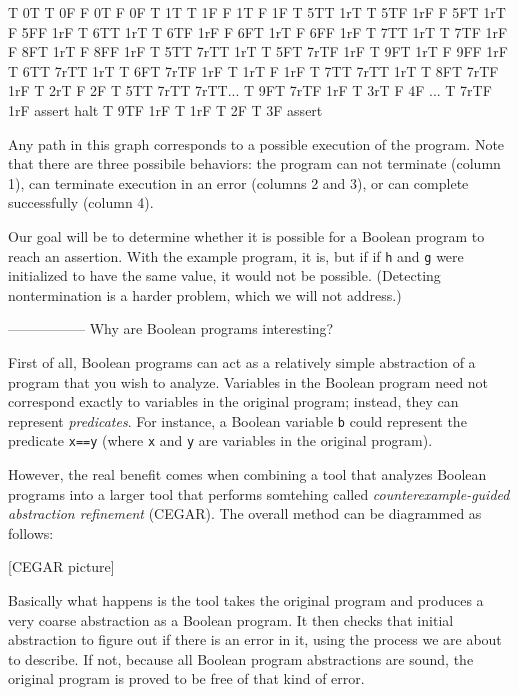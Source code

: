 \documentclass{article}
\newcommand{\code}[1]{\texttt{#1}}
\begin{document}
  T 0T               T 0F            F 0T          F 0F
  T 1T               T 1F            F 1T          F 1F
  T 5TT 1rT          T 5TF 1rF       F 5FT 1rT     F 5FF 1rF
  T 6TT 1rT          T 6TF 1rF       F 6FT 1rT     F 6FF 1rF
  T 7TT 1rT          T 7TF 1rF       F 8FT 1rT     F 8FF 1rF
  T 5TT 7rTT 1rT     T 5FT 7rTF 1rF  T 9FT 1rT     F 9FF 1rF
  T 6TT 7rTT 1rT     T 6FT 7rTF 1rF  T 1rT         F 1rF
  T 7TT 7rTT 1rT     T 8FT 7rTF 1rF  T 2rT         F 2F
  T 5TT 7rTT 7rTT... T 9FT 7rTF 1rF  T 3rT         F 4F
       ...           T 7rTF 1rF      assert        halt
                     T 9TF 1rF
                     T 1rF
                     T 2F
                     T 3F
                     assert


Any path in this graph corresponds to a possible execution of the
program. Note that there are three possibile behaviors: the program
can not terminate (column 1), can terminate execution in an error
(columns 2 and 3), or can complete successfully (column 4).

Our goal will be to determine whether it is possible for a Boolean
program to reach an assertion. With the example program, it is, but if
if \code{h} and \code{g} were initialized to have the same value, it
would not be possible. (Detecting nontermination is a harder problem,
which we will not address.)

-----------------
Why are Boolean programs interesting?

First of all, Boolean programs can act as a relatively simple
abstraction of a program that you wish to analyze. Variables in the
Boolean program need not correspond exactly to variables in the
original program; instead, they can represent \emph{predicates}. For
instance, a Boolean variable \code{b} could represent the predicate
\code{x==y} (where \code{x} and \code{y} are variables in the original
program).

However, the real benefit comes when combining a tool that analyzes
Boolean programs into a larger tool that performs somtehing called
\emph{counterexample-guided abstraction refinement} (CEGAR). The
overall method can be diagrammed as follows:

[CEGAR picture]

Basically what happens is the tool takes the original program and
produces a very coarse abstraction as a Boolean program. It then
checks that initial abstraction to figure out if there is an error in
it, using the process we are about to describe. If not, because all
Boolean program abstractions are sound, the original program is proved
to be free of that kind of error.
\end{document}
